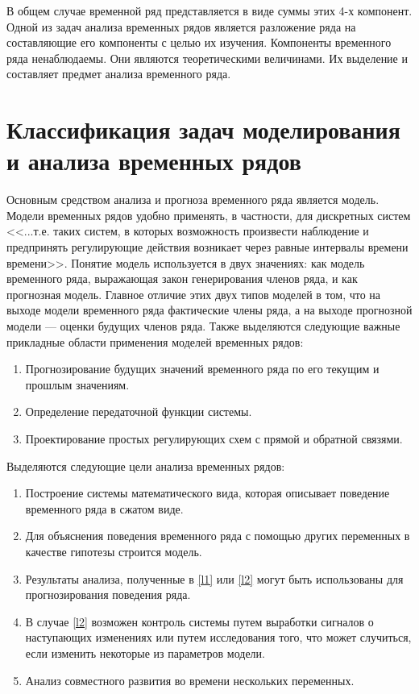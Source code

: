 В общем случае временной ряд представляется в виде суммы этих 4-х компонент. Одной из задач анализа временных рядов является разложение ряда на составляющие его компоненты с целью их изучения. Компоненты временного ряда ненаблюдаемы. Они являются теоретическими величинами. Их выделение и составляет предмет анализа временного ряда. 

\section{Классификация задач моделирования и анализа временных рядов}
Основным средством анализа и прогноза временного ряда является модель. Модели временных рядов удобно применять, в частности, для дискретных систем <<...т.е. таких систем, в которых возможность произвести наблюдение и предпринять регулирующие действия возникает через равные интервалы времени времени>>.
Понятие модель используется в двух значениях: как модель временного ряда, выражающая закон
генерирования членов ряда, и как прогнозная модель. Главное отличие этих двух типов моделей в том,
что на выходе модели временного ряда фактические члены ряда, а на выходе прогнозной модели — оценки будущих
членов ряда.
Также выделяются следующие важные прикладные области применения моделей временных рядов:
\begin{enumerate}
	\item Прогнозирование будущих значений временного ряда по его текущим и прошлым значениям.
	\item Определение передаточной функции системы.
	\item Проектирование простых регулирующих схем с прямой и обратной связями.
\end{enumerate}
Выделяются следующие цели анализа временных рядов:
\begin{enumerate}
	\item \label{l1} Построение системы математического вида, которая описывает поведение временного ряда в сжатом виде.
	\item \label{l2} Для объяснения поведения временного ряда с помощью других переменных в качестве гипотезы строится модель.
	\item \label{l3} Результаты анализа, полученные в  \ref{l1} или  \ref{l2} могут быть использованы для прогнозирования поведения ряда.
	\item \label{l4} В случае \ref{l2} возможен контроль системы путем выработки сигналов о наступающих изменениях или путем исследования того, что может случиться, если изменить некоторые из параметров модели.
	\item \label{l5} Анализ совместного развития во времени нескольких переменных.
\end{enumerate}

